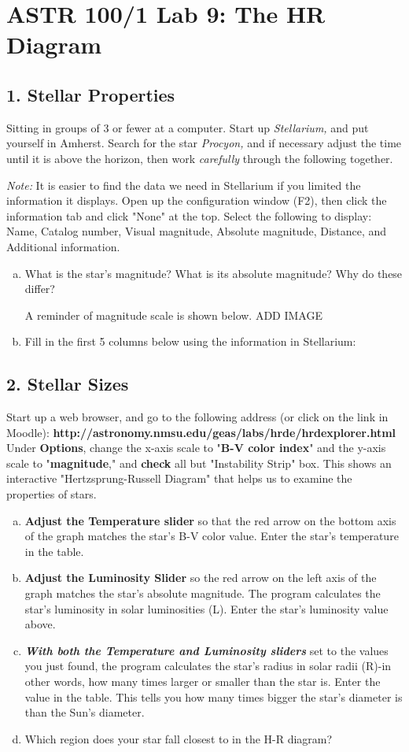\documentclass[main.tex]{subfiles}
\begin{document}
\section*{ASTR 100/1 Lab 9: The HR Diagram}
\subsection*{1. Stellar Properties}
Sitting in groups of 3 or fewer at a computer. Start up \textit{Stellarium,} and put yourself in Amherst. Search for the star \textit{Procyon,} and if necessary adjust the time until it is above the horizon, then work \textit{carefully} through the following together. 

\textit{Note:} It is easier to find the data we need in Stellarium if you limited the information it displays. Open up the configuration window (F2), then click the information tab and click "None" at the top. Select the following to display: Name, Catalog number, Visual magnitude, Absolute magnitude, Distance, and Additional information.
\begin{enumerate} [a.]
    \item What is the star's magnitude? What is its absolute magnitude? Why do these differ? 
    
    A reminder of magnitude scale is shown below.
    ADD IMAGE
    \item Fill in the first 5 columns below using the information in Stellarium:
\end{enumerate}

\subsection*{2. Stellar Sizes}
Start up a web browser, and go to the following address (or click on the link in Moodle): \textbf{http://astronomy.nmsu.edu/geas/labs/hrde/hrd\textunderscore explorer.html} Under \textbf{Options}, change the x-axis scale to "\textbf{B-V color index}" and the y-axis scale to "\textbf{magnitude}," and \textbf{check} all but "Instability Strip" box. This shows an interactive "Hertzsprung-Russell Diagram" that helps us to examine the properties of stars.
\begin{enumerate} [a.]
    \item \textbf{Adjust the Temperature slider} so that the red arrow on the bottom axis of the graph matches the star's B-V color value. Enter the star's temperature in the table.
    \item \textbf{Adjust the Luminosity Slider} so the red arrow on the left axis of the graph matches the star's absolute magnitude. The program calculates the star's luminosity in solar luminosities (L). Enter the star's luminosity value above. 
    \item \textbf{\textit{With both the Temperature and Luminosity sliders}} set to the values you just found, the program calculates the star's radius in solar radii (R)-in other words, how many times larger or smaller than the star is. Enter the value in the table. This tells you how many times bigger the star's diameter is than the Sun's diameter. 
    \item Which region does your star fall closest to in the H-R diagram?
\end{enumerate}
\end{document}
